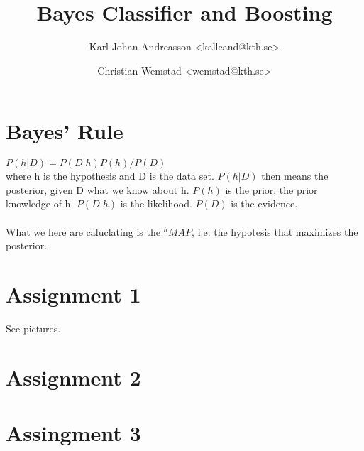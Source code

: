 \documentclass[a4paper]{article}
\title{Bayes Classifier and Boosting}
\author{Karl Johan Andreasson <{kalleand@kth.se}> %
\and Christian Wemstad <{wemstad@kth.se}> %
}
\begin{document}
\thispagestyle{empty}
\maketitle
\thispagestyle{empty}
\pagestyle{empty}
\newpage
\pagestyle{fancy}
\setcounter{page}{1}
\section{Bayes' Rule}
$P(h|D) = P(D|h)P(h)/P(D)$
\\ where h is the hypothesis and D is the data set.
$P(h|D)$ then means the posterior, given D what we know about h.
$P(h)$ is the prior, the prior knowledge of h.
$P(D|h)$ is the likelihood.
$P(D)$ is the evidence.
\\
\\
\noindent What we here are caluclating is the $^hMAP$,
i.e. the hypotesis that maximizes the posterior.

\section{Assignment 1}
See pictures. 
\section{Assignment 2}

\section{Assingment 3}
\end{document}
